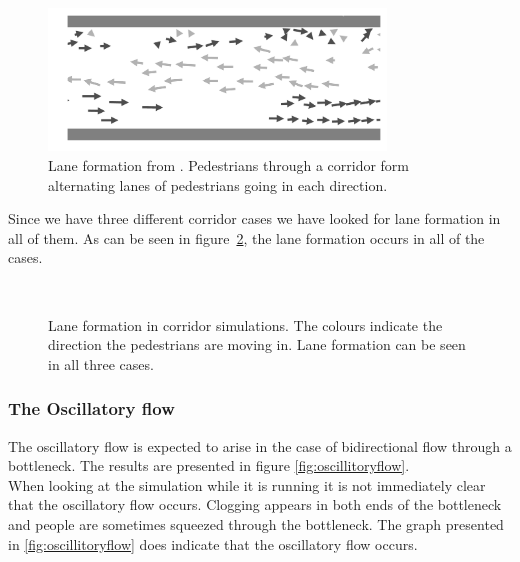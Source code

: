 \begin{figure}[h]
    \centering
    \includegraphics[width=0.8\textwidth]{Figures/flow_lanes_litterature.png}
    \caption[Lane formation from \cite{lanes}]{Lane formation from 
    \cite{lanes}. Pedestrians through a corridor form alternating lanes of 
    pedestrians going in each direction.}
    \label{fig:lanes-literature}
\end{figure}

Since we have three different corridor cases we have looked for lane
formation in all of them. As can be seen in figure~\ref{fig:laneformation}, 
the lane formation occurs in all of the cases.

\begin{figure}[h]
    \centering
    \\
    \caption[Lane formation in corridor simulations]{Lane formation in 
    corridor simulations. The colours indicate the direction the pedestrians 
    are moving in. Lane formation can be seen in all three cases.}
    \label{fig:laneformation}
\end{figure}

\subsubsection{The Oscillatory flow}
The oscillatory flow is expected to arise in the case of bidirectional
flow through a bottleneck. The results are presented in figure
\ref{fig:oscillitoryflow}.\\

When looking at the simulation while it is running it is not
immediately clear that the oscillatory flow occurs. Clogging
appears in both ends of the bottleneck and people are sometimes
squeezed through the bottleneck. The graph presented in
\ref{fig:oscillitoryflow} does indicate that the oscillatory
flow occurs.

